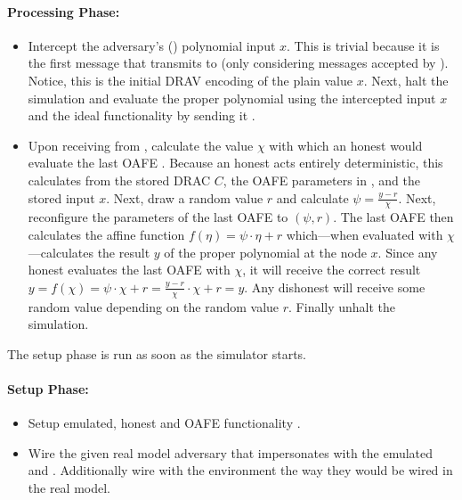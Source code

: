 \paragraph{Processing Phase:}

\begin{itemize}

  \item Intercept the adversary's (\JWadv{}) polynomial input $x$. This is
    trivial because it is the first message that \JWadv{} transmits to
    \JWfuncSymOAFE{} (only considering messages accepted by \JWfuncSymOAFE{}).
    Notice, this is the initial DRAV encoding of the plain value $x$. Next, halt
    the simulation and evaluate the proper polynomial using the intercepted
    input $x$ and the ideal functionality \JWfuncSymOPEnp{} by sending it
    .

  \item Upon receiving  from \JWfuncSymOPEnp{},
    calculate the value $\chi$ with which an honest \JWpTwo{} would evaluate the
    last OAFE . Because an honest \JWpTwo{} acts entirely deterministic, this
    calculates from the stored DRAC $C$, the OAFE parameters in \JWfuncSymOAFE,
    and the stored input $x$. Next, draw a random value $r$ and calculate $\psi
    = \frac{y-r}{\chi}$. Next, reconfigure the parameters of the last OAFE to
    $(\psi, r)$. The last OAFE then calculates the affine function $f(\eta) =
    \psi \cdot \eta + r$ which---when evaluated with $\chi$---calculates the
    result $y$ of the proper polynomial at the node $x$. Since any honest
    \JWpTwo{} evaluates the last OAFE with $\chi$, it will receive the correct
    result $y = f(\chi) = \psi \cdot \chi + r = \frac{y-r}{\chi} \cdot \chi + r
    = y$. Any dishonest \JWpTwo{} will receive some random value depending on
    the random value $r$. Finally unhalt the simulation.

\end{itemize}


\label{sec:simulator-goliath}

The setup phase is run as soon as the simulator starts.

\paragraph{Setup Phase:}

\begin{itemize}

  \item Setup emulated, honest \JWpTwo{} and OAFE functionality
    \JWfuncSymOAFE{}.

  \item Wire the given real model adversary \JWadv{} that impersonates \JWpOne{}
    with the emulated \JWpTwo{} and \JWfuncSymOAFE{}. Additionally wire \JWadv{}
    with the environment the way they would be wired in the real model.

\end{itemize}

